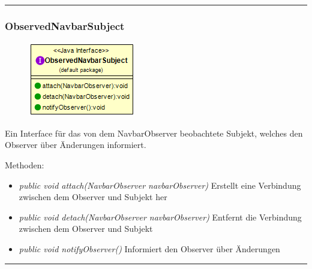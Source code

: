 \rule{\textwidth}{0.4pt}
\subsubsection{ObservedNavbarSubject}
\begin{minipage}{0.3\textwidth}
    \begin{figure}[H]
        {\centering\includegraphics[scale = 0.6
        ]{media/view/view/ObservedNavbarSubject_Class.png}}
    \end{figure}
    \end{minipage} \hfill
    \begin{minipage}{0.6\textwidth}
Ein Interface für das von dem NavbarObserver beobachtete Subjekt, welches den Observer über Änderungen informiert.
\end{minipage}
\vspace{\baselineskip}
Methoden: \begin{itemize} [noitemsep]
    \item \emph{public void attach(NavbarObserver navbarObserver)} Erstellt eine Verbindung zwischen dem Observer und Subjekt her
    \item \emph{public void detach(NavbarObserver navbarObserver)} Entfernt die Verbindung zwischen dem Observer und Subjekt
    \item \emph{public void notifyObserver()} Informiert den Observer über Änderungen
\end{itemize}

\rule{\textwidth}{0.4pt}
